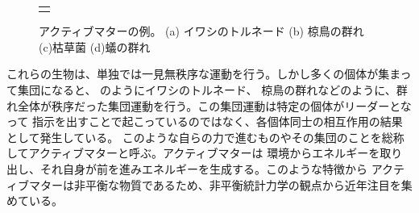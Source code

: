 \documentclass[/Users/ikedahajime/GitHub/reserch/master_report/thesis]{subfiles}
\begin{document}
\begin{figure}
\begin{tabular}{c}
\begin{minipage}{0.25\hsize}
        \end{minipage}
    \end{tabular}
    \caption[Four sample images]
    {
        アクティブマターの例。 (a) イワシのトルネード\cite{school_of_fish} (b) 椋鳥の群れ\cite{mukudori_group} (c)枯草菌\cite{dombrowskiSelfConcentrationLargeScaleCoherence2004}
        (d)蟻の群れ\cite{schneirla1944unique}
    }
    \label{fig:example_actmat}
\end{figure}
これらの生物は、単独では一見無秩序な運動を行う。しかし多くの個体が集まって集団になると、
のようにイワシのトルネード、
椋鳥の群れなどのように、群れ全体が秩序だった集団運動を行う。この集団運動は特定の個体がリーダーとなって
指示を出すことで起こっているのではなく、各個体同士の相互作用の結果として発生している。
このような自らの力で進むものやその集団のことを総称してアクティブマターと呼ぶ。アクティブマターは
環境からエネルギーを取り出し、それ自身が前を進みエネルギーを生成する。このような特徴から
アクティブマターは非平衡な物質であるため、非平衡統計力学の観点から近年注目を集めている。%
\end{document}
